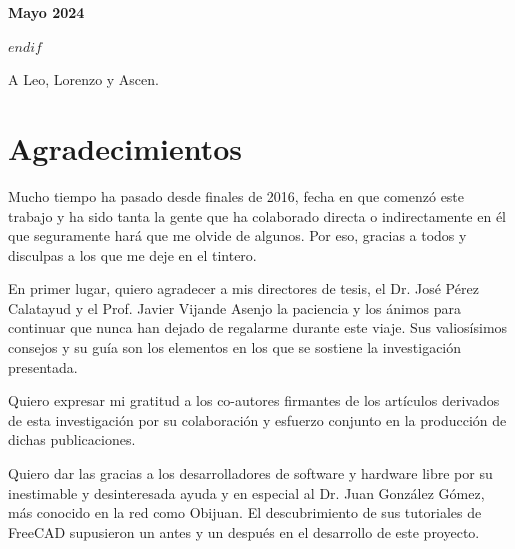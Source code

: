 \vfill %

{\bfseries\large Mayo 2024 \par}
\raggedright
$endif$

\newpage
\thispagestyle{empty}
\begin{flushright}
\end{flushright}


\newpage
\thispagestyle{empty}
\begin{flushright}
A Leo, Lorenzo y Ascen.
\end{flushright}


\newpage
\thispagestyle{empty}
\begin{flushright}
\end{flushright}



\hypertarget{Agradecimientos}{%
\chapter*{Agradecimientos}\label{agradecimientos}}


Mucho tiempo ha pasado desde finales de 2016, fecha en que comenzó este trabajo y ha sido tanta la gente que ha colaborado directa o indirectamente en él que seguramente hará que me olvide de algunos. Por eso, gracias a todos y disculpas a los que me deje en el tintero.

En primer lugar, quiero agradecer a mis directores de tesis, el Dr. José Pérez Calatayud y el Prof. Javier Vijande Asenjo la paciencia y los ánimos para continuar que nunca han dejado de regalarme durante este viaje. Sus valiosísimos consejos y su guía son los elementos en los que se sostiene la investigación presentada.         

Quiero expresar mi gratitud a los co-autores firmantes de los artículos derivados de esta investigación por su colaboración y esfuerzo conjunto en la producción de dichas publicaciones.

Quiero dar las gracias a los desarrolladores de software y hardware libre por su inestimable y desinteresada ayuda y en especial al Dr. Juan González Gómez, más conocido en la red como Obijuan. El descubrimiento de sus tutoriales de FreeCAD supusieron un antes y un después en el desarrollo de este proyecto.   


